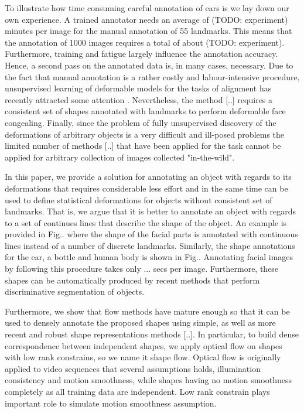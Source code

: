 To illustrate how time consuming careful annotation of ears is we lay down our own experience. A trained annotator needs an average of (TODO: experiment) minutes per image for the manual annotation of 55 landmarks. This means that the annotation of 1000 images requires a total of about (TODO: experiment). Furthermore,  training and fatigue largely influence the annotation accuracy. Hence, a second pass on the annotated data is, in many cases, necessary. Due to the fact that manual annotation is a rather costly and labour-intensive procedure, unsupervised learning of deformable models for the tasks of alignment has recently attracted some attention \cite{?}. Nevertheless, the method [..] requires a consistent set of shapes annotated with landmarks to perform deformable face congealing. Finally, since the problem of fully unsupervised discovery of the deformations of arbitrary objects is a very difficult and ill-posed problems the limited number of methods [..] that have been applied for the task cannot be applied for arbitrary collection of images collected "in-the-wild". 


In this paper, we provide a solution for annotating an object with regards to its deformations that requires considerable less effort and in the same time can be used to define statistical deformations for objects without consistent set of landmarks. That is, we argue that it is better to annotate an object with regards to a set of continues lines that describe the shape of the object. An example is provided in Fig.. where the shape of the facial parts is annotated with continuous lines instead of a number of discrete landmarks. Similarly, the shape annotations for the ear, a bottle and human body is shown in Fig.. Annotating facial images by following this procedure takes only ... secs per image. Furthermore, these shapes can be automatically produced by recent methods that perform discriminative segmentation of objects. 

Furthermore, we show that flow methods have mature enough so that it can be used to densely annotate the proposed shapes using simple, as well as more recent and robust shape representations methods [..].  In particular, to build dense correspondence between independent shapes, we apply optical flow on shapes with low rank constrains, so we name it shape flow. Optical flow is originally applied to video sequences that several assumptions holds, illumination consistency and motion smoothness, while shapes having no motion smoothness completely as all training data are independent. Low rank constrain plays important role to simulate motion smoothness assumption. 

